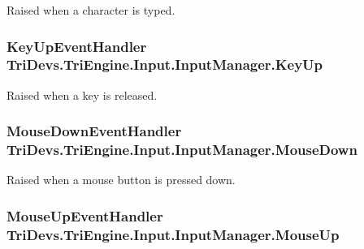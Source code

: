 Raised when a character is typed. 

\hypertarget{class_tri_devs_1_1_tri_engine_1_1_input_1_1_input_manager_a3668ba5096e9a56e9dd9915226a08281}{
\subsubsection[{Key\-Up}]{\setlength{\rightskip}{0pt plus 5cm}Key\-Up\-Event\-Handler Tri\-Devs.\-Tri\-Engine.\-Input.\-Input\-Manager.\-Key\-Up}}\label{class_tri_devs_1_1_tri_engine_1_1_input_1_1_input_manager_a3668ba5096e9a56e9dd9915226a08281}


Raised when a key is released. 

\hypertarget{class_tri_devs_1_1_tri_engine_1_1_input_1_1_input_manager_a5a8c7a1c91a25f3450645f86d3c29c73}{
\subsubsection[{Mouse\-Down}]{\setlength{\rightskip}{0pt plus 5cm}Mouse\-Down\-Event\-Handler Tri\-Devs.\-Tri\-Engine.\-Input.\-Input\-Manager.\-Mouse\-Down}}\label{class_tri_devs_1_1_tri_engine_1_1_input_1_1_input_manager_a5a8c7a1c91a25f3450645f86d3c29c73}


Raised when a mouse button is pressed down. 

\hypertarget{class_tri_devs_1_1_tri_engine_1_1_input_1_1_input_manager_a36a84ba77a6b620406e62db5709a67b5}{
\subsubsection[{Mouse\-Up}]{\setlength{\rightskip}{0pt plus 5cm}Mouse\-Up\-Event\-Handler Tri\-Devs.\-Tri\-Engine.\-Input.\-Input\-Manager.\-Mouse\-Up}}\label{class_tri_devs_1_1_tri_engine_1_1_input_1_1_input_manager_a36a84ba77a6b620406e62db5709a67b5}


